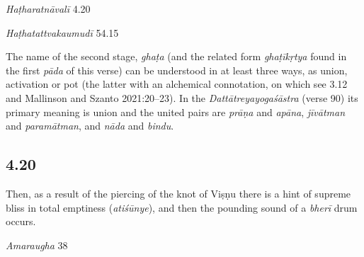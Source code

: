 \begin{ekdosis}
\begin{testimonia}[hp04_019]
\emph{Haṭharatnāvalī} 4.20
\begin{versinnote}
\end{versinnote}

\emph{Haṭhatattvakaumudī} 54.15
\begin{versinnote}
\end{versinnote}
\end{testimonia}

\begin{philcomm}[hp04_019]
The name of the second stage, \emph{ghaṭa} (and the related form \emph{ghaṭīkṛtya} found in the first \emph{pāda} of this verse) can be understood in at least three ways, as union, activation or pot (the latter with an alchemical connotation, on which see 3.12 and Mallinson and Szanto 2021:20–23). In the \emph{Dattātreyayogaśāstra} (verse 90) its primary meaning is union and the united pairs are \emph{prāṇa} and \emph{apāna}, \emph{jīvātman} and \emph{paramātman}, and \emph{nāda} and \emph{bindu}.
\end{philcomm}

\subsection*{4.20}
\begin{translation}[hp04_020]
Then, as a result of the piercing of the knot of Viṣṇu there is a hint of supreme bliss in total emptiness (\emph{atiśūnye}), and then the pounding sound of a \textit{bherī} drum occurs.%
\end{translation}

\begin{sources}[hp04_020]
\emph{Amaraugha} 38
\begin{versinnote}
\tl{\var{atiśūnye ] Ad Gb Ta : atiśūnyo $\beta$ Ba}\\+}
\tl{\var{tato ] $\beta$ : tathā  Ba : tadā Ad Gb Ta}\\!}
\end{versinnote}
\end{sources}


\end{ekdosis}
